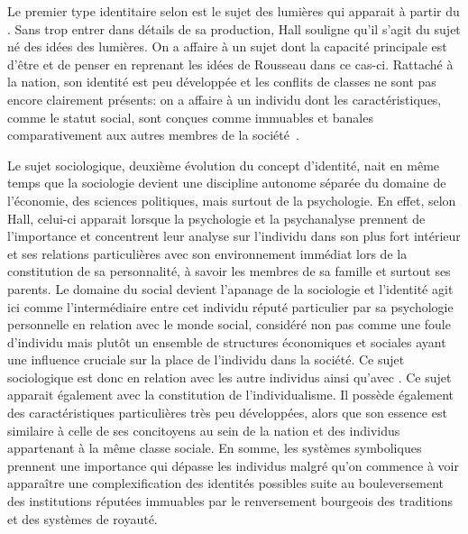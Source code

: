 Le premier type identitaire selon \citeauthor{Hall1996a} est le sujet des lumières qui apparait à partir du . 
Sans trop entrer dans détails de sa production, Hall souligne qu'il s'agit du sujet né des idées des lumières. 
On a affaire à un sujet dont la capacité principale est d'être et de penser en reprenant les idées de Rousseau dans ce cas-ci. 
Rattaché à la nation, son identité est peu développée et les conflits de classes ne sont pas encore clairement présents: on a affaire à un individu dont les caractéristiques, comme le statut social, sont conçues comme immuables et banales comparativement aux autres membres de la société~\citeyearpar[596]{Hall1996a}.

Le sujet sociologique, deuxième évolution du concept d'identité, nait en même temps que la sociologie devient une discipline autonome séparée du domaine de l'économie, des sciences politiques, mais surtout de la psychologie. 
En effet, selon Hall, celui-ci apparait lorsque la psychologie et la psychanalyse prennent de l'importance et concentrent leur analyse sur l'individu dans son plus fort intérieur et ses relations particulières avec son environnement immédiat lors de la constitution de sa personnalité, à savoir les membres de sa famille et surtout ses parents. 
Le domaine du social devient l'apanage de la sociologie et l'identité agit ici comme l'intermédiaire entre cet individu réputé particulier par sa psychologie personnelle en relation avec le monde social, considéré non pas comme une foule d'individu mais plutôt un ensemble de structures économiques et sociales ayant une influence cruciale sur la place de l'individu dans la société. 
Ce sujet sociologique est donc en relation avec les autre individus ainsi qu'avec . 
Ce sujet apparait également avec la constitution de l'individualisme. 
Il possède également des caractéristiques particulières très peu développées, alors que son essence est similaire à celle de ses concitoyens au sein de la nation et des individus appartenant à la même classe sociale. 
En somme, les systèmes symboliques prennent une importance qui dépasse les individus malgré qu'on commence à voir apparaître une complexification des identités possibles suite au bouleversement des institutions réputées immuables par le renversement bourgeois des traditions et des systèmes de royauté. 

